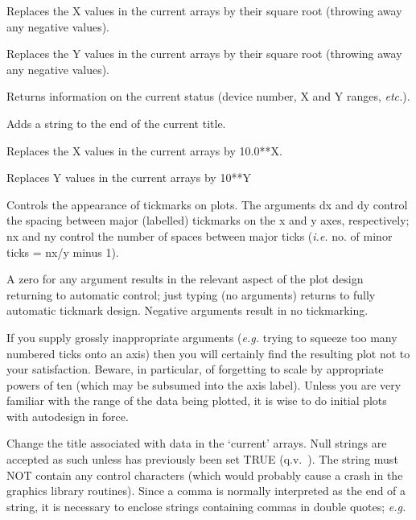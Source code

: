 \begin {description}
Replaces the X values in the current arrays by their square root
(throwing away any negative values).

Replaces the Y values in the current arrays by their square root
(throwing away any negative values).

Returns information on the current status (device number, X and Y
ranges, {\em etc.}).

Adds a string to the end of the current title.

Replaces the X values in the current arrays by 10.0**X.

Replaces Y values in the current arrays by 10**Y

Controls the appearance of tickmarks on plots. The arguments dx and dy
control the spacing between major (labelled) tickmarks on the x and y
axes, respectively; nx and ny control the number of spaces between
major ticks ({\em i.e.} no. of minor ticks = nx/y minus 1).

A zero for any argument results in the relevant aspect of the plot
design returning to automatic control; just typing   (no
arguments) returns to fully automatic tickmark design. Negative
arguments result in no tickmarking.

If you supply grossly inappropriate arguments ({\em e.g.} trying to
squeeze too many numbered ticks onto an axis) then you will certainly
find the resulting plot not to your satisfaction. Beware, in
particular, of forgetting to scale by appropriate powers of ten (which
may be subsumed into the axis label). Unless you are very familiar
with the range of the data being plotted, it is wise to do initial
plots with autodesign in force.

Change the title associated with data in the `current' arrays. Null
strings are accepted as such unless   has previously been set
TRUE (q.v.\ ).  The string must NOT contain any control
characters (which would probably cause a crash in the graphics library
routines). Since a comma is normally interpreted as the end of a
string, it is necessary to enclose strings containing commas in double
quotes; {\em e.g.}


\end{description}
